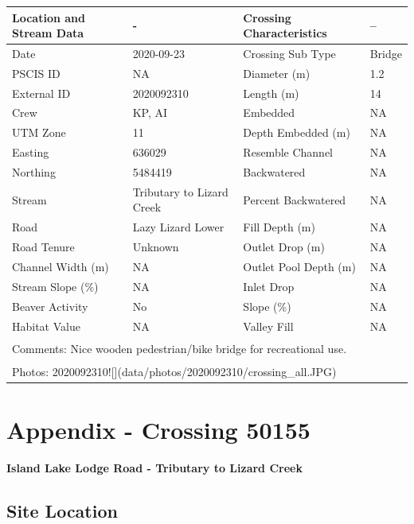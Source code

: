 \documentclass[
]{book}
\begin{document}
\begin{tabular}{l|l|l|l}
\hline
Location and Stream Data & - & Crossing Characteristics & --\\
\hline
Date & 2020-09-23 & Crossing Sub Type & Bridge\\
\hline
PSCIS ID & NA & Diameter (m) & 1.2\\
\hline
External ID & 2020092310 & Length (m) & 14\\
\hline
Crew & KP, AI & Embedded & NA\\
\hline
UTM Zone & 11 & Depth Embedded (m) & NA\\
\hline
Easting & 636029 & Resemble Channel & NA\\
\hline
Northing & 5484419 & Backwatered & NA\\
\hline
Stream & Tributary to Lizard Creek & Percent Backwatered & NA\\
\hline
Road & Lazy Lizard Lower & Fill Depth (m) & NA\\
\hline
Road Tenure & Unknown & Outlet Drop (m) & NA\\
\hline
Channel Width (m) & NA & Outlet Pool Depth (m) & NA\\
\hline
Stream Slope (\%) & NA & Inlet Drop & NA\\
\hline
Beaver Activity & No & Slope (\%) & NA\\
\hline
Habitat Value & NA & Valley Fill & NA\\
\hline
\multicolumn{4}{l}{\textsuperscript{} Comments: Nice wooden pedestrian/bike bridge for recreational use.}\\
\multicolumn{4}{l}{\textsuperscript{} Photos: 2020092310![](data/photos/2020092310/crossing\_all.JPG)}\\
\end{tabular}

\hypertarget{appendix---crossing-50155}{%
\chapter*{Appendix - Crossing 50155}\label{appendix---crossing-50155}}

\textbf{Island Lake Lodge Road - Tributary to Lizard Creek}

\hypertarget{site-location}{%
\section*{Site Location}\label{site-location}}
\end{document}

